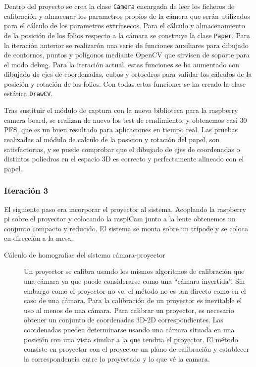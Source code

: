 Dentro del proyecto se crea la clase \texttt{Camera} encargada de leer los ficheros de calibración y almacenar los parametros propios de la cámera que serán utilizados para el cálculo de los parametros extrínsecos. 
Para el cálculo y almacenamiento de la posición de los folios respecto a la cámara se construye la clase \texttt{Paper}.
Para la iteración anterior se realizarón una serie de funciones auxiliares para dibujado de contornos, puntos y polígonos mediante OpenCV que sirvisen de soporte para el modo debug. Para la iteración actual, estas funciones se ha aumentado con dibujado de ejes de coordenadas, cubos y ortoedros para validar los cálculos de la posición y rotación de los folios. Con todas estas funciones se ha creado la clase estática \texttt{DrawCV}. 

Tras sustituir el módulo de captura con la nueva biblioteca para la raspberry camera board, se realizan de nuevo los test de rendimiento, y obtenemos casi 30 PFS, que es un buen resultado para aplicaciones en tiempo real.
Las pruebas realizadas al módulo de calculo de la posicion y rotación del papel, son satisfactorias, y se puede comprobar que el dibujado de ejes de coordenadas o distintos poliedros en el espacio 3D es correcto y perfectamente alineado con el papel. 

\subsubsection{Iteración 3}
El siguiente paso era incorporar el proyector al sistema. Acoplando la raspberry pi sobre el proyector y colocando la raspiCam junto a la lente obtenemos un conjunto compacto y reducido. El sistema se monta sobre un trípode y se coloca en dirección a la mesa.



\begin{description}
\item [Cálculo de homografias del sistema cámara-proyector] Un proyector se calibra usando los mismos algoritmos de calibración que una cámara ya que puede considerarse como una ``cámara invertida''. Sin embargo como el proyector no ve, el método no es tan directo como en el caso de una cámara.
Para la calibración de un proyector es inevitable el uso al menos de una cámara. Para calibrar un proyector, es necesario obtener un conjunto de coordenadas 3D-2D correspondientes. Las coordenadas pueden determinarse usando una cámara situada en una posición con una vista similar a la que tendria el proyector. El método consiste en proyectar con el proyector un plano de calibración y establecer la correspondencia entre lo proyectado y lo que vé la camara.
\end{description}
